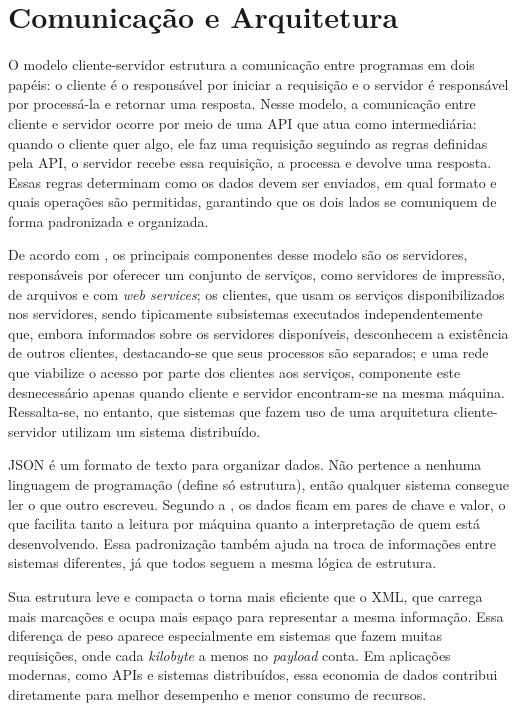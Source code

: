 \documentclass[
    12pt
    ,oneside
    ,a4paper
    ,chapter=TITLE
    ,section=TITLE
    ,sumario=abnt-6027-2012]{abntex2}
\begin{document}
\chapter{Comunicação e Arquitetura}
\label{cap:archteture}

O modelo cliente-servidor estrutura a comunicação entre programas em dois papéis: o cliente é o responsável por iniciar a requisição e o servidor é responsável por processá-la e retornar uma resposta. Nesse modelo, a comunicação entre cliente e servidor ocorre por meio de uma API que atua como intermediária: quando o cliente quer algo, ele faz uma requisição seguindo as regras definidas pela API, o servidor recebe essa requisição, a processa e devolve uma resposta. Essas regras determinam como os dados devem ser enviados, em qual formato e quais operações são permitidas, garantindo que os dois lados se comuniquem de forma padronizada e organizada.

De acordo com , os principais componentes desse modelo são os servidores, responsáveis por oferecer um conjunto de serviços, como servidores de impressão, de arquivos e com \textit{web services}; os clientes, que usam os serviços disponibilizados nos servidores, sendo tipicamente subsistemas executados independentemente que, embora informados sobre os servidores disponíveis, desconhecem a existência de outros clientes, destacando-se que seus processos são separados; e uma rede que viabilize o acesso por parte dos clientes aos serviços, componente este desnecessário apenas quando cliente e servidor encontram-se na mesma máquina. Ressalta-se, no entanto, que sistemas que fazem uso de uma arquitetura cliente-servidor utilizam um sistema distribuído.
    
JSON é um formato de texto para organizar dados. Não pertence a nenhuma linguagem de programação (define só estrutura), então qualquer sistema consegue ler o que outro escreveu. Segundo a , os dados ficam em pares de chave e valor, o que facilita tanto a leitura por máquina quanto a interpretação de quem está desenvolvendo. Essa padronização também ajuda na troca de informações entre sistemas diferentes, já que todos seguem a mesma lógica de estrutura.

Sua estrutura leve e compacta o torna mais eficiente que o XML, que carrega mais marcações e ocupa mais espaço para representar a mesma informação. Essa diferença de peso aparece especialmente em sistemas que fazem muitas requisições, onde cada \textit{kilobyte} a menos no \textit{payload} conta. Em aplicações modernas, como APIs e sistemas distribuídos, essa economia de dados contribui diretamente para melhor desempenho e menor consumo de recursos.
\end{document}
